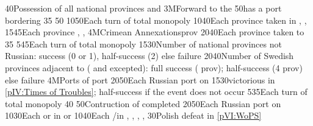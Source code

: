 %
%
{}{40}{Possession of all national provinces and \provinceSmolenska}%
%
\EUobjective3M{Forward to the \regionBaltique}{}%
{}{50}{\paysmajeurRussie has a port bordering \regionBaltique}%
%
%
{}{35}{}%
%
%
{}{50}{}%
%
%
%
{10}{50}{Each turn of total  monopoly}%
%
%
%
{10}{40}{Each province taken in \paysmajeurPologne, \paysmajeurLithuanie,
  \paysukraine}%
%
%
{15}{45}{Each province \provinceNeva, \provinceLivonija, \provinceEstland}%
%
\EUobjective4M{Crimean Annexations}{prov}%
{20}{40}{Each province taken to \payscrimee}%
%
%
{}{35}{}%
%
%
%
{5}{45}{Each turn of total  monopoly}%
%
%
{15}{30}{Number of national provinces not Russian: success (0 or 1),
  half-success (2) else failure}%
%
%
{20}{40}{Number of Swedish provinces adjacent to \regionBaltique (\regionSuede
  and \regionFinlande excepted): full success ( prov);
  half-success (4 prov) else failure}%
%
%
\EUobjective4M{Ports of }{port}%
{20}{50}{Each Russian port on }%
%
%
{15}{30}{\RUS victorious in \ref{pIV:Times of Troubles}; half-success if the
  event does not occur}%
%
%
%
{5}{35}{Each turn of total  monopoly}%
%
%
{}{40}{}%
%
%
{}{50}{Contruction of  completed}%
%
%
{20}{50}{Each Russian port on }%
%
%
{10}{30}{Each \COL or \TP in  or }%
%
%
%
{10}{40}{Each \COL/\TP in \granderegionAmour, \granderegionBaikal,
  \granderegionAfghanistan, \granderegionPerse, \continentIndia}%
%
%
{}{30}{Polish defeat in \ref{pVI:WoPS}}%
